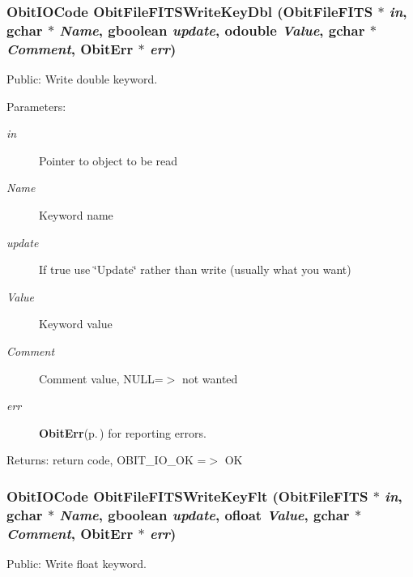 \subsubsection{\setlength{\rightskip}{0pt plus 5cm}Obit\-IOCode Obit\-File\-FITSWrite\-Key\-Dbl ({\bf Obit\-File\-FITS} $\ast$ {\em in}, gchar $\ast$ {\em Name}, gboolean {\em update}, {\bf odouble} {\em Value}, gchar $\ast$ {\em Comment}, {\bf Obit\-Err} $\ast$ {\em err})}\label{ObitFileFITS_8h_a21}


Public: Write double keyword. 

\begin{Desc}
\item[Parameters:]
\begin{description}
\item[{\em in}]Pointer to object to be read \item[{\em Name}]Keyword name \item[{\em update}]If true use \char`\"{}Update\char`\"{} rather than write (usually what you want) \item[{\em Value}]Keyword value \item[{\em Comment}]Comment value, NULL=$>$ not wanted \item[{\em err}]{\bf Obit\-Err}{\rm (p.\,\pageref{structObitErr})} for reporting errors. \end{description}
\end{Desc}
\begin{Desc}
\item[Returns:]return code, OBIT\_\-IO\_\-OK =$>$ OK \end{Desc}
\subsubsection{\setlength{\rightskip}{0pt plus 5cm}Obit\-IOCode Obit\-File\-FITSWrite\-Key\-Flt ({\bf Obit\-File\-FITS} $\ast$ {\em in}, gchar $\ast$ {\em Name}, gboolean {\em update}, {\bf ofloat} {\em Value}, gchar $\ast$ {\em Comment}, {\bf Obit\-Err} $\ast$ {\em err})}\label{ObitFileFITS_8h_a20}


Public: Write float keyword. 

